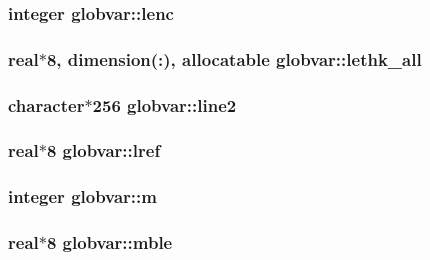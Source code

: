 \subsubsection[{lenc}]{\setlength{\rightskip}{0pt plus 5cm}integer globvar\+::lenc}\label{namespaceglobvar_a00121cf01b80ef938df02e8b6a38231c}
\hypertarget{namespaceglobvar_ac8f321181d3578817641ebd2f3ecfce3}{}
\subsubsection[{lethk\+\_\+all}]{\setlength{\rightskip}{0pt plus 5cm}real$\ast$8, dimension(\+:), allocatable globvar\+::lethk\+\_\+all}\label{namespaceglobvar_ac8f321181d3578817641ebd2f3ecfce3}
\hypertarget{namespaceglobvar_a1620db6ffc17c057934b90f70421dd96}{}
\subsubsection[{line2}]{\setlength{\rightskip}{0pt plus 5cm}character$\ast$256 globvar\+::line2}\label{namespaceglobvar_a1620db6ffc17c057934b90f70421dd96}
\hypertarget{namespaceglobvar_afb77a410f2b53e316ddde5d09eed140e}{}
\subsubsection[{lref}]{\setlength{\rightskip}{0pt plus 5cm}real$\ast$8 globvar\+::lref}\label{namespaceglobvar_afb77a410f2b53e316ddde5d09eed140e}
\hypertarget{namespaceglobvar_ad09e0e97534b13d507e3e376b768ace2}{}
\subsubsection[{m}]{\setlength{\rightskip}{0pt plus 5cm}integer globvar\+::m}\label{namespaceglobvar_ad09e0e97534b13d507e3e376b768ace2}
\hypertarget{namespaceglobvar_a60e1f3c0590fe494deaaa98bde27c96f}{}
\subsubsection[{mble}]{\setlength{\rightskip}{0pt plus 5cm}real$\ast$8 globvar\+::mble}\label{namespaceglobvar_a60e1f3c0590fe494deaaa98bde27c96f}
\hypertarget{namespaceglobvar_a9f55e62c22dc5aef4a6167ef140b95d4}{}
